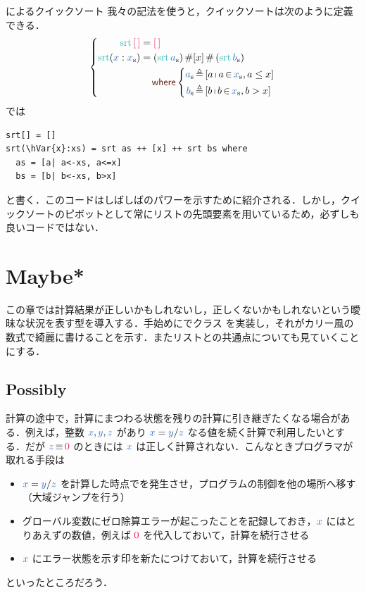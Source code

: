 \documentclass[a5paper,twoside,fleqn,draft]{jsbook}
\begin{document}
\begin{note}{\haskell によるクイックソート}
我々の記法を使うと，クイックソートは次のように定義できる．
\begin{equation*}
  \left\{
  \begin{aligned}
    \mSort{\hEmptyList}
    &={\hEmptyList}\\
    \mSort(\hVar{x}:\hListVar{x})
    &=(\mSort\hListVar{a})\hAppend[x]\hAppend{}(\mSort\hListVar{b})\\
    &\quad\mWhere\left\{\begin{aligned}
    \hListVar{a}&\mLetEq{}[a\mListComp a\mFrom\hListVar{x},a\le x]\\
    \hListVar{b}&\mLetEq{}[b\mListComp b\mFrom\hListVar{x},b>x]
    \end{aligned}
    \right.
  \end{aligned}
  \right.
\end{equation*}
\haskell では %
\begin{haskellcode}
\begin{verbatim}
srt[] = []
srt(\hVar{x}:xs) = srt as ++ [x] ++ srt bs where
  as = [a| a<-xs, a<=x]
  bs = [b| b<-xs, b>x]
\end{verbatim}
\end{haskellcode}
と書く．このコードはしばしば\haskell のパワーを示すために紹介される．しかし，クイックソートのピボットとして常にリストの先頭要素を用いているため，必ずしも良いコードではない．
\end{note}

\chapter{Maybe*}
\label{ch:maybe}

\begin{leader}
この章では計算結果が正しいかもしれないし，正しくないかもしれないという曖昧な状況を表す型を導入する．手始めに\python でクラス  を実装し，それがカリー風の数式で綺麗に書けることを示す．またリストとの共通点についても見ていくことにする．
\end{leader}

\section{Possibly}

計算の途中で，計算にまつわる状態を残りの計算に引き継ぎたくなる場合がある．例えば，整数 $\hVar{x},\hVar{y},\hVar{z}$ があり $\hVar{x}=\hVar{y}/\hVar{z}$ なる値を続く計算で利用したいとする．だが $\hVar{z}\hIfEq\hConstant{0}$ のときには $\hVar{x}$ は正しく計算されない．こんなときプログラマが取れる手段は
\begin{itemize}
\item $\hVar{x}=\hVar{y}/\hVar{z}$ を計算した時点でを発生させ，プログラムの制御を他の場所へ移す（大域ジャンプを行う）
\item グローバル変数にゼロ除算エラーが起こったことを記録しておき，$\hVar{x}$ にはとりあえずの数値，例えば $\hConstant{0}$ を代入しておいて，計算を続行させる
\item $\hVar{x}$ にエラー状態を示す印を新たにつけておいて，計算を続行させる
\end{itemize}
といったところだろう．
\end{document}
